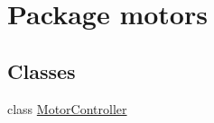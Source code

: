 \hypertarget{namespacemotors}{\section{Package motors}
\label{namespacemotors}
}
\subsection*{Classes}
\begin{DoxyCompactItemize}
\item 
class \hyperlink{classmotors_1_1_motor_controller}{Motor\-Controller}
\end{DoxyCompactItemize}
